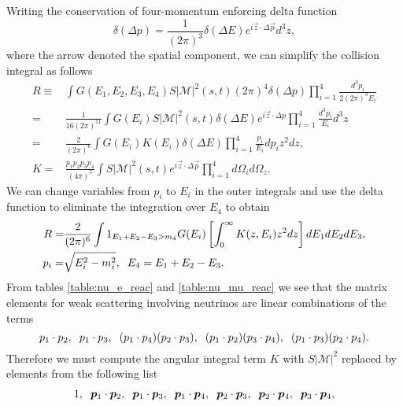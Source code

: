 \begin{subappendices}
 Writing the conservation of four-momentum enforcing delta function
\begin{equation}
\delta(\Delta p)=\frac{1}{(2\pi)^3}\delta(\Delta E)e^{i\vec z\cdot \Delta \vec p}d^3z,
\end{equation}
where the arrow denoted the spatial component, we can simplify the collision integral as follows
\begin{align}
R\equiv&\int G(E_1,E_2,E_3,E_4) S|\mathcal{M}|^2(s,t)(2\pi)^4\delta(\Delta p)\prod_{i=1}^4\frac{d^3p_i}{2(2\pi)^3 E_i}\\
=&\frac{1}{16(2\pi)^{11}}\int G(E_i) S|\mathcal{M}|^2(s,t)\delta(\Delta E)e^{i\vec z\cdot\Delta p}\prod_{i=1}^4\frac{d^3p_i}{ E_i}d^3z\\
=&\frac{2}{(2\pi)^{6}}\int G(E_i)K(E_i) \delta(\Delta E)\prod_{i=1}^4\frac{p_i}{E_i}dp_i z^2dz,\\
K=&\frac{p_1p_2p_3p_4}{(4\pi)^5}\int S|\mathcal{M}|^2(s,t)e^{i\vec z\cdot\Delta\vec p}\prod_{i=1}^4d\Omega_id\Omega_z.
\end{align}
We can change variables from $p_i$ to $E_i$ in the outer integrals and use the delta function to eliminate the integration over $E_4$ to obtain
\begin{align}
R=&\frac{2}{(2\pi)^{6}}\int1_{E_1+E_2-E_3>m_4}G(E_i)\left[\int_0^\infty K(z,E_i)z^2dz\right]dE_1dE_2dE_3,\\
p_i=&\sqrt{E_i^2-m_i^2},\hspace{2mm} E_4=E_1+E_2-E_3.
\end{align}
From tables \ref{table:nu_e_reac} and \ref{table:nu_mu_reac} we see that the matrix elements for weak scattering involving neutrinos are linear combinations of the terms
\begin{equation}
p_1\cdot p_2,\hspace{2mm} p_1\cdot p_3,\hspace{2mm}(p_1\cdot p_4)(p_2\cdot p_3), \hspace{2mm} (p_1\cdot p_2)(p_3\cdot p_4),\hspace{2mm} (p_1\cdot p_3)(p_2\cdot p_4).
\end{equation}
Therefore we must compute the angular integral term $K$ with $S|\mathcal{M}|^2$ replaced by elements from the following list
\begin{align}\label{matrix_element_pieces}
&1,\hspace{2mm}\vec p_1 \cdot\vec p_2,\hspace{2mm}\vec p_1 \cdot\vec p_3,\hspace{2mm}\vec p_1 \cdot\vec p_4 ,\hspace{2mm}\vec p_2\cdot\vec p_3,\hspace{2mm}\vec p_2\cdot\vec p_4 ,\hspace{2mm}\vec p_3\cdot\vec p_4 ,\\

\end{align}
\end{subappendices}
